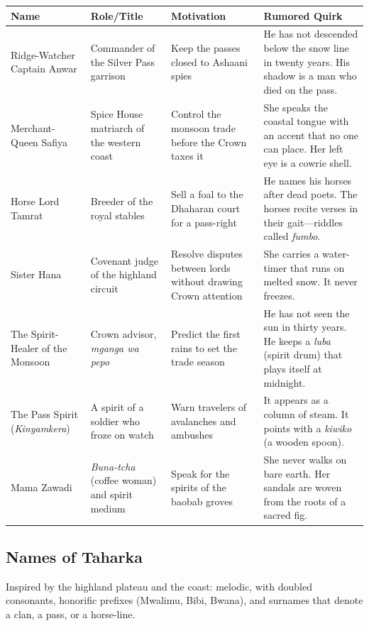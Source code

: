 \begin{longtable}{|p{}|p{}|p{}|p{}|}
\hline
\textbf{Name} & \textbf{Role/Title} & \textbf{Motivation} & \textbf{Rumored Quirk} \\
\hline
Ridge-Watcher Captain Anwar & Commander of the Silver Pass garrison & Keep the passes closed to Ashaani spies & He has not descended below the snow line in twenty years. His shadow is a man who died on the pass. \\
\hline
Merchant-Queen Safiya & Spice House matriarch of the western coast & Control the monsoon trade before the Crown taxes it & She speaks the coastal tongue with an accent that no one can place. Her left eye is a cowrie shell. \\
\hline
Horse Lord Tamrat & Breeder of the royal stables & Sell a foal to the Dhaharan court for a pass-right & He names his horses after dead poets. The horses recite verses in their gait---riddles called \textit{fumbo}. \\
\hline
Sister Hana & Covenant judge of the highland circuit & Resolve disputes between lords without drawing Crown attention & She carries a water-timer that runs on melted snow. It never freezes. \\
\hline
The Spirit-Healer of the Monsoon & Crown advisor, \textit{mganga wa pepo} & Predict the first rains to set the trade season & He has not seen the sun in thirty years. He keeps a \textit{luba} (spirit drum) that plays itself at midnight. \\
\hline
The Pass Spirit (\textit{Kinyamkera}) & A spirit of a soldier who froze on watch & Warn travelers of avalanches and ambushes & It appears as a column of steam. It points with a \textit{kiwiko} (a wooden spoon). \\
\hline
Mama Zawadi & \textit{Buna-tcha} (coffee woman) and spirit medium & Speak for the spirits of the baobab groves & She never walks on bare earth. Her sandals are woven from the roots of a sacred fig. \\
\hline
\end{longtable}

\subsection{Names of Taharka}
\label{sec:taharka-names}

Inspired by the highland plateau and the coast: melodic, with doubled consonants, honorific prefixes (Mwalimu, Bibi, Bwana), and surnames that denote a clan, a pass, or a horse-line.

